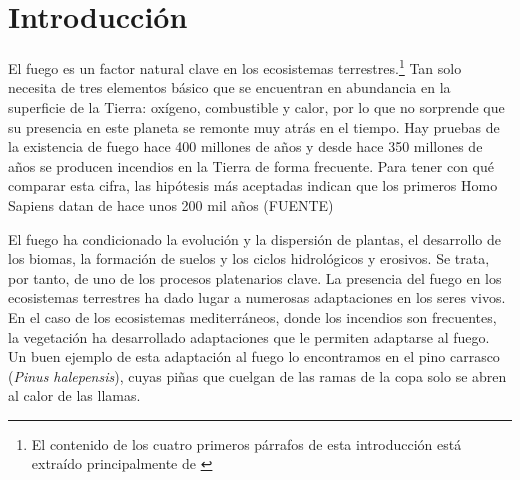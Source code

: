 \documentclass[12pt,a4paper,]{book}
\title{}
\author{Nombre Completo Autor}
\date{18/11/2021}
\def\ifdoblecara{} %
\def\ifprincipal{} %
\let\ifprincipal\undefined %
\let\rmarkdownfootnote\footnote%
\def\footnote{\protect\rmarkdownfootnote}
\numberwithin{dummy}{section}
\theoremstyle{ocrenumbox}
\theoremstyle{blacknumex}
\theoremstyle{blacknumbox}
\theoremstyle{ocrenum}
\theoremstyle{ocrenum}
\begin{document}




\raggedbottom

\ifdefined\ifprincipal
\else
\setlength{\parindent}{1em}
\pagestyle{fancy}
\setcounter{tocdepth}{4}
\tableofcontents

\fi

\ifdefined\ifdoblecara
\fancyhead{}{}
\fancyhead[LE,RO]{\scriptsize\rightmark}
\fancyfoot[LO,RE]{\scriptsize\slshape \leftmark}
\fancyfoot[C]{}
\fancyfoot[LE,RO]{\footnotesize\thepage}
\else
\fancyhead{}{}
\fancyhead[RO]{\scriptsize\rightmark}
\fancyfoot[LO]{\scriptsize\slshape \leftmark}
\fancyfoot[C]{}
\fancyfoot[RO]{\footnotesize\thepage}
\fi

\renewcommand{\headrulewidth}{0.4pt}
\renewcommand{\footrulewidth}{0.4pt}

\hypertarget{introducciuxf3n}{%
\chapter{Introducción}\label{introducciuxf3n}}

El fuego es un factor natural clave en los ecosistemas
terrestres.\footnote{El contenido de los cuatro primeros párrafos de
  esta introducción está extraído principalmente de \citet{MataixCerda}}
Tan solo necesita de tres elementos básico que se encuentran en
abundancia en la superficie de la Tierra: oxígeno, combustible y calor,
por lo que no sorprende que su presencia en este planeta se remonte muy
atrás en el tiempo. Hay pruebas de la existencia de fuego hace 400
millones de años y desde hace 350 millones de años se producen incendios
en la Tierra de forma frecuente. Para tener con qué comparar esta cifra,
las hipótesis más aceptadas indican que los primeros Homo Sapiens datan
de hace unos 200 mil años (FUENTE)

El fuego ha condicionado la evolución y la dispersión de plantas, el
desarrollo de los biomas, la formación de suelos y los ciclos
hidrológicos y erosivos. Se trata, por tanto, de uno de los procesos
platenarios clave. La presencia del fuego en los ecosistemas terrestres
ha dado lugar a numerosas adaptaciones en los seres vivos. En el caso de
los ecosistemas mediterráneos, donde los incendios son frecuentes, la
vegetación ha desarrollado adaptaciones que le permiten adaptarse al
fuego. Un buen ejemplo de esta adaptación al fuego lo encontramos en el
pino carrasco (\emph{Pinus halepensis}), cuyas piñas que cuelgan de las
ramas de la copa solo se abren al calor de las llamas.
\end{document}
